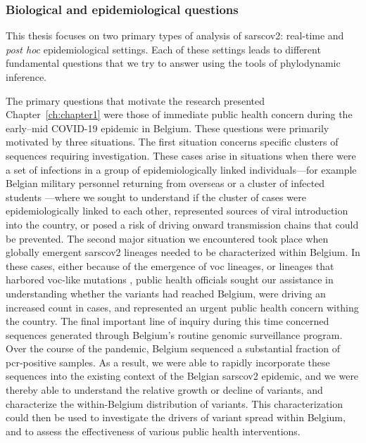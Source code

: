 \subsubsection{Biological and epidemiological questions}
This thesis focuses on two primary types of analysis of \gls{sarscov2}: real-time and \textit{post hoc} epidemiological settings.
Each of these settings leads to different fundamental questions that we try to answer using the tools of phylodynamic inference.

The primary questions that motivate the research presented Chapter~\ref{ch:chapter1} were those of immediate public health concern during the early--mid COVID-19 epidemic in Belgium.
These questions were primarily motivated by three situations. 
The first situation concerns specific clusters of sequences requiring investigation.
These cases arise in situations when there were a set of infections in a group of epidemiologically linked individuals---for example Belgian military personnel returning from overseas \citep{pirnay2020study} or a cluster of infected students \citep{vanelslande2022two}---where we sought to understand if the cluster of cases were epidemiologically linked to each other, represented sources of viral introduction into the country, or posed a risk of driving onward transmission chains that could be prevented.
The second major situation we encountered took place when globally emergent \gls{sarscov2} lineages needed to be characterized within Belgium.
In these cases, either because of the emergence of \gls{voc} lineages, or lineages that harbored \gls{voc}-like mutations \citep{dudas2021emergence}, public health officials sought our assistance in understanding whether the variants had reached Belgium, were driving an increased count in cases, and represented an urgent public health concern withing the country.
The final important line of inquiry during this time concerned sequences generated through Belgium's routine genomic surveillance program.
Over the course of the pandemic, Belgium sequenced a substantial fraction of \gls{pcr}-positive samples.
As a result, we were able to rapidly incorporate these sequences into the existing context of the Belgian \gls{sarscov2} epidemic, and we were thereby able to understand the relative growth or decline of variants, and characterize the within-Belgium distribution of variants.
This characterization could then be used to investigate the drivers of variant spread within Belgium, and to assess the effectiveness of various public health interventions.

